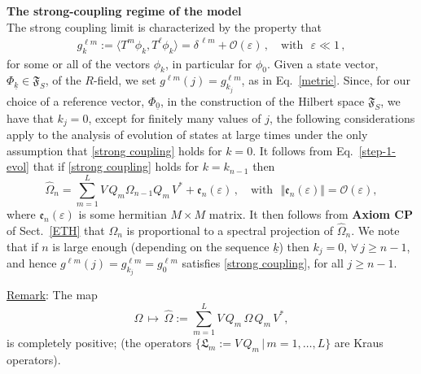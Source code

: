 \documentclass[a4paper,11pt]{article}
\begin{document}
{{\bf{The strong-coupling regime of the model}}\\

The strong coupling limit is characterized by the property that
\begin{align}\label{strong coupling}
g_{k}^ {\ell m} := \langle T^{m} \phi_{k}, T^{\ell} \phi_{k} \rangle = \delta^{\,\ell m} + \mathcal{O}(\varepsilon)\,, \quad \text{with }\,\,\varepsilon \ll 1\,,
\end{align}
for some or all of the vectors $\phi_{k}$, in particular for $\phi_0$. Given a state vector, 
$\Phi_{\underline{k}}\in \mathfrak{F}_S$, of the $R$-field, we set $g^{\ell m}(j)= g_{k_j}^{\ell m}$, 
as in Eq.~\eqref{metric}. Since, for our choice of a reference vector, $\Phi_{\underline{0}}$, in the construction 
of the Hilbert space $\mathfrak{F}_S$, we have that $k_j = 0$, except for finitely many values of $j$, 
the following considerations apply to the analysis of evolution of states at large times under the only assumption that \eqref{strong coupling} holds for $k =0$. 
It follows from Eq.~\eqref{step-1-evol} that if \eqref{strong coupling} holds for $k=k_{n-1}$ then
\begin{equation}\label{Markovian}
\widehat{\Omega}_n = \sum_{m=1}^{L} V\,Q_m \Omega_{n-1} Q_m \,V^{*}+ \mathfrak{e}_{n}(\varepsilon)\,, \quad \text{with }
\,\, \Vert \mathfrak{e}_{n}(\varepsilon) \Vert = \mathcal{O}(\varepsilon),
\end{equation}
where $\mathfrak{e}_n(\varepsilon)$ is some hermitian $M\times M$ matrix. It then follows from {\bf{Axiom CP}} 
of Sect.~\ref{ETH}  that $\Omega_n$ is proportional to a spectral projection of $\widehat{\Omega}_n$.
We note that if $n$ is large enough (depending on the sequence $\underline{k}$) then $k_j =0, \,\forall \, j\geq n-1$, 
and hence $g^{\ell m}(j) = g_{k_j}^{\ell m} = g_{0}^{\ell m}$ satisfies \eqref{strong coupling}, for all $j \geq n-1$. 

\underline{Remark}: The map
\begin{equation}\label{CP}
\Omega\, \mapsto\, \widehat{\Omega} := \sum_{m =1}^{L} V\,Q_{m}\, \Omega \, Q_{m} \, V^{*}, 
\end{equation}
is completely positive; (the operators $\big\{\mathfrak{L}_{m}:=V\,Q_{m}\,\vert\, m=1,\dots, L\big\}$ are Kraus operators). \\

}
\end{document}
